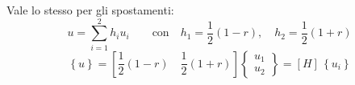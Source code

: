 Vale lo stesso per gli spostamenti:
\begin{equation*}
    u=\sum^2_{i=1} h_iu_i \qquad \text{con} \quad h_1=\frac{1}{2}(1-r), \quad  h_2=\frac{1}{2}(1+r)
\end{equation*}
\begin{equation*}
    \left\{u \right\} = \left[\frac{1}{2}(1-r) \quad  \frac{1}{2}(1+r)\right]\begin{Bmatrix}
        u_1\\u_2
    \end{Bmatrix}= [H] \,\left\{u_i \right\}
\end{equation*}





